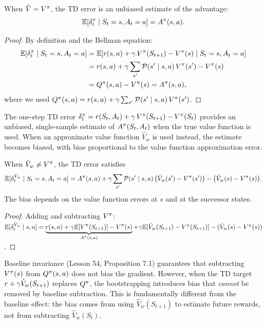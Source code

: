 \documentclass[11pt,a4paper]{article}
\begin{document}
\begin{theorem}
\label{thm:td-advantage}
When $\hat{V} = V^{\pi}$, the TD error is an unbiased estimate of the
advantage:
\[
  \mathbb{E}[\delta_t^\pi \mid S_t = s, A_t = a] = A^\pi(s, a).
\]
\end{theorem}

\begin{proof}
By definition and the Bellman equation:
\begin{align*}
  \mathbb{E}[\delta_t^\pi \mid S_t = s, A_t = a]
  &= \mathbb{E}[r(s,a) + \gamma\, V^{\pi}(S_{t+1}) - V^{\pi}(s) \mid S_t = s, A_t = a] \\
  &= r(s,a) + \gamma \sum_{s'} \mathcal{P}(s' \mid s, a)\, V^{\pi}(s') - V^{\pi}(s) \\
  &= Q^{\pi}(s,a) - V^{\pi}(s) = A^\pi(s,a),
\end{align*}
where we used $Q^{\pi}(s,a) = r(s,a) + \gamma \sum_{s'} \mathcal{P}(s' \mid s,a)\,
V^{\pi}(s')$.
\end{proof}

\begin{keyresult}[title={TD Error and the Advantage Function}]
The one-step TD error $\delta_t^\pi = r(S_t, A_t) + \gamma\,
V^{\pi}(S_{t+1}) - V^{\pi}(S_t)$ provides an unbiased, single-sample estimate
of $A^\pi(S_t, A_t)$ when the true value function is used. When an
approximate value function $\hat{V}_w$ is used instead, the estimate
becomes biased, with bias proportional to the value function
approximation error.
\end{keyresult}

\begin{proposition}
\label{prop:td-bias}
When $\hat{V}_w \neq V^{\pi}$, the TD error satisfies
\[
  \mathbb{E}[\delta_t^{\hat{V}_w} \mid S_t = s, A_t = a]
  = A^\pi(s,a) + \gamma \sum_{s'} \mathcal{P}(s' \mid s,a)\,
  \bigl(\hat{V}_w(s') - V^{\pi}(s')\bigr) - \bigl(\hat{V}_w(s) - V^{\pi}(s)\bigr).
\]
The bias depends on the value function errors at $s$ and at the
successor states.
\end{proposition}

\begin{proof}
Adding and subtracting $V^{\pi}$: $\mathbb{E}[\delta_t^{\hat{V}_w} \mid s, a]
= \underbrace{r(s,a) + \gamma \mathbb{E}[V^{\pi}(S_{t+1})] - V^{\pi}(s)}_{A^\pi(s,a)}
+ \gamma \mathbb{E}[\hat{V}_w(S_{t+1}) - V^{\pi}(S_{t+1})]
- (\hat{V}_w(s) - V^{\pi}(s))$.
\end{proof}

\begin{warning}[title={Bias Cannot Be Eliminated by Baseline Invariance}]
Baseline invariance (Lesson 54, Proposition 7.1) guarantees that
subtracting $V^{\pi}(s)$ from $Q^{\pi}(s,a)$ does not bias the gradient.
However, when the TD target $r + \gamma \hat{V}_w(S_{t+1})$ replaces
$Q^{\pi}$, the bootstrapping introduces bias that \emph{cannot} be removed
by baseline subtraction. This is fundamentally different from the
baseline effect: the bias comes from using $\hat{V}_w(S_{t+1})$ to
estimate future rewards, not from subtracting $\hat{V}_w(S_t)$.
\end{warning}
\end{document}

